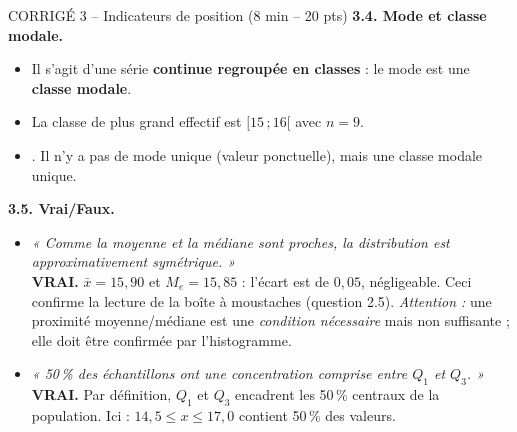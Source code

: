 \documentclass[11pt,a4paper]{article}
\begin{document}
\begin{epreuve}{CORRIGÉ 3 -- Indicateurs de position \hfill \small (8 min -- 20 pts)}
\vspace{0.3cm}
\textbf{3.4. Mode et classe modale.}
\begin{itemize}[leftmargin=*,itemsep=1pt]
  \item Il s'agit d'une série \textbf{continue regroupée en classes} : le mode est une \textbf{classe modale}.
  \item La classe de plus grand effectif est $[15\,;16[$ avec $n = 9$.
  \item \fbox{Classe modale : $[15\,;16[$}. Il n'y a pas de mode unique (valeur ponctuelle), mais une classe modale unique.
\end{itemize}

\vspace{0.3cm}
\textbf{3.5. Vrai/Faux.}
\begin{itemize}[leftmargin=*,itemsep=2pt]
  \item \emph{« Comme la moyenne et la médiane sont proches, la distribution est approximativement symétrique. »} \\
  \textbf{VRAI.} $\bar{x} = 15{,}90$ et $M_e = 15{,}85$ : l'écart est de $0{,}05$, négligeable. Ceci confirme la lecture de la boîte à moustaches (question 2.5). \emph{Attention :} une proximité moyenne/médiane est une \emph{condition nécessaire} mais non suffisante ; elle doit être confirmée par l'histogramme.
  \item \emph{« 50\,\% des échantillons ont une concentration comprise entre $Q_1$ et $Q_3$. »} \\
  \textbf{VRAI.} Par définition, $Q_1$ et $Q_3$ encadrent les 50\,\% centraux de la population. Ici : $14{,}5 \le x \le 17{,}0$ contient 50\,\% des valeurs.
\end{itemize}

\end{epreuve}

\newpage
\end{document}
